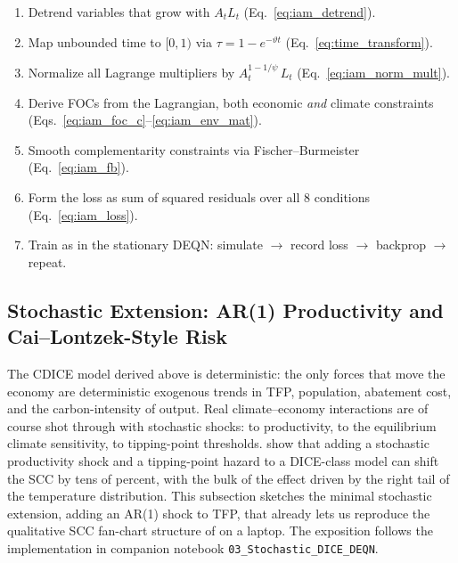 \documentclass[11pt,a4paper]{report}
\begin{document}
\begin{keyinsightbox}
\begin{enumerate}[itemsep=2pt,leftmargin=1.6em]
\item Detrend variables that grow with $A_t L_t$ (Eq.~\ref{eq:iam_detrend}).
\item Map unbounded time to $[0,1)$ via $\tau = 1 - e^{-\vartheta t}$ (Eq.~\ref{eq:time_transform}).
\item Normalize all Lagrange multipliers by $A_t^{1-1/\psi}\,L_t$ (Eq.~\ref{eq:iam_norm_mult}).
\item Derive FOCs from the Lagrangian, both economic \emph{and} climate constraints (Eqs.~\ref{eq:iam_foc_c}--\ref{eq:iam_env_mat}).
\item Smooth complementarity constraints via Fischer--Burmeister (Eq.~\ref{eq:iam_fb}).
\item Form the loss as sum of squared residuals over all 8 conditions (Eq.~\ref{eq:iam_loss}).
\item Train as in the stationary DEQN: simulate $\to$ record loss $\to$ backprop $\to$ repeat.
\end{enumerate}
\end{keyinsightbox}

\subsection{Stochastic Extension: AR(1) Productivity and Cai--Lontzek-Style Risk}
\label{sec:stochastic_dice}

The CDICE model derived above is deterministic: the only forces that move the economy are deterministic exogenous trends in TFP, population, abatement cost, and the carbon-intensity of output.  Real climate--economy interactions are of course shot through with stochastic shocks: to productivity, to the equilibrium climate sensitivity, to tipping-point thresholds.  \citet{caiSocialCostCarbon2019} show that adding a stochastic productivity shock and a tipping-point hazard to a DICE-class model can shift the SCC by tens of percent, with the bulk of the effect driven by the right tail of the temperature distribution.  This subsection sketches the minimal stochastic extension, adding an AR(1) shock to TFP, that already lets us reproduce the qualitative SCC fan-chart structure of \citeauthor{caiSocialCostCarbon2019} on a laptop.  The exposition follows the implementation in companion notebook \texttt{03\_Stochastic\_DICE\_DEQN}.
\end{document}
